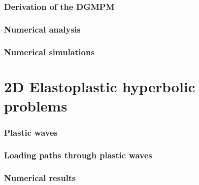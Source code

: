 \documentclass[11pt,aspectratio=169]{beamer}
\makeatletter
\let\oldpart\part
\def\part#1{\def\@currentlabelname{#1}\oldpart{#1}}
\makeatother
\begin{document}
\section{Derivation of the DGMPM}



\section{Numerical analysis}



\section{Numerical simulations}




\part{2D Elastoplastic hyperbolic problems}\label{part:part2}
\section{Plastic waves}



\section{Loading paths through plastic waves}

\section{Numerical results}




\end{document}
